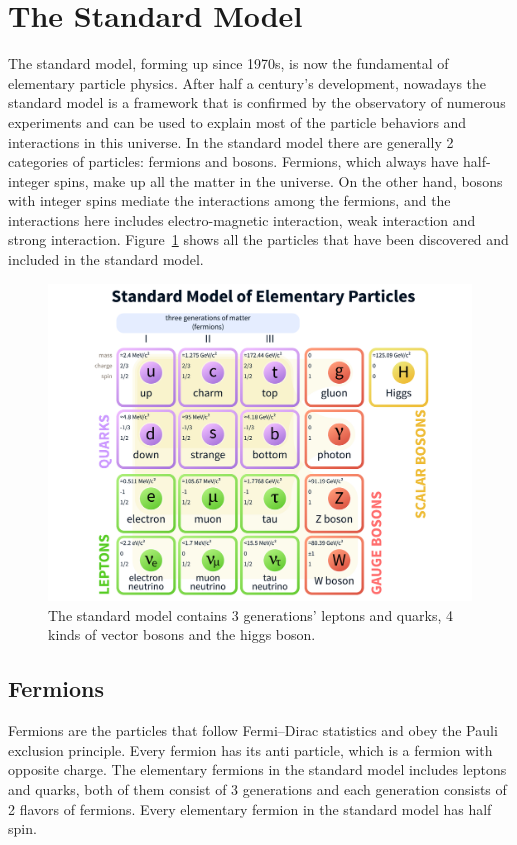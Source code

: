 
\section{The Standard Model}
The standard model\cite{SMref1}\cite{SMref2}\cite{SMref3}, forming up since 1970s, is now the fundamental of elementary particle physics. After half a century's development, nowadays the standard model is a framework that is confirmed by the observatory of numerous experiments and can be used to explain most of the particle behaviors and interactions in this universe. In the standard model there are generally 2 categories of particles: fermions and bosons. Fermions, which always have half-integer spins, make up all the matter in the universe. On the other hand, bosons with integer spins mediate the interactions among the fermions, and the interactions here includes electro-magnetic interaction, weak interaction and strong interaction. Figure~\ref{fig:smpfamily} shows all the particles that have been discovered and included in the standard model.
\begin{figure}[htbp]
\begin{center}
\includegraphics[width=0.72\linewidth]{figures/smpfamily.pdf}
\caption{The standard model contains 3 generations' leptons and quarks, 4 kinds of vector bosons and the higgs boson.}
\label{fig:smpfamily}
\end{center}
\end{figure}

\subsection{Fermions}
Fermions are the particles that follow Fermi–Dirac statistics and obey the Pauli exclusion principle. Every fermion has its anti particle, which is a fermion with opposite charge. The elementary fermions in the standard model includes leptons and quarks, both of them consist of 3 generations and each generation consists of 2 flavors of fermions. Every elementary fermion in the standard model has half spin. 
